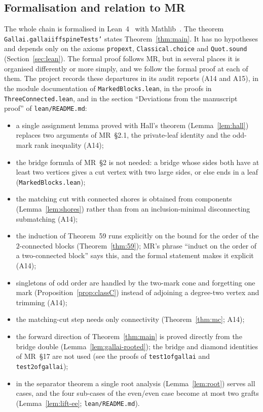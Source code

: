 \documentclass[11pt]{amsart}
\theoremstyle{definition}
\theoremstyle{remark}
\renewcommand{\_}{\oldunderscore\allowbreak}
\begin{document}
\subsection*{Formalisation and relation to MR}
The whole chain is formalised in Lean~4~\cite{Lean4} with Mathlib~\cite{Mathlib}. The theorem
\texttt{Gallai.gallai\_iff\_spineTests'} states Theorem~\ref{thm:main}. It has no hypotheses and
depends only on the axioms \texttt{propext}, \texttt{Classical.choice} and \texttt{Quot.sound}
(Section~\ref{sec:lean}). The formal proof follows MR, but in several places it is organised
differently or more simply, and we follow the formal proof at each of them. The project records
these departures in its audit reports (A14 and A15), in the module documentation of
\texttt{MarkedBlocks.lean}, in the proofs in \texttt{ThreeConnected.lean}, and in the section
``Deviations from the manuscript proof'' of \texttt{lean/README.md}:
\begin{itemize}
\item a single assignment lemma proved with Hall's theorem (Lemma~\ref{lem:hall}) replaces two
arguments of MR~\S2.1, the private-leaf identity and the odd-mark rank inequality (A14);
\item the bridge formula of MR~\S2 is not needed: a bridge whose sides both have at least two
vertices gives a cut vertex with two large sides, or else ends in a leaf (\texttt{MarkedBlocks.lean});
\item the matching cut with connected shores is obtained from components
(Lemma~\ref{lem:shores}) rather than from an inclusion-minimal disconnecting submatching (A14);
\item the induction of Theorem~59 runs explicitly on the bound for the order of the
$2$-connected blocks (Theorem~\ref{thm:59}); MR's phrase ``induct on the order of a two-connected
block'' says this, and the formal statement makes it explicit (A14);
\item singletons of odd order are handled by the two-mark cone and forgetting one mark
(Proposition~\ref{prop:classC}) instead of adjoining a degree-two vertex and trimming (A14);
\item the matching-cut step needs only connectivity (Theorem~\ref{thm:mc}; A14);
\item the forward direction of Theorem~\ref{thm:main} is proved directly from the bridge double
(Lemma~\ref{lem:gallai-rooted}); the bridge and diamond identities of MR~\S17 are not used
(see the proofs of \texttt{test1\_of\_gallai} and \texttt{test2\_of\_gallai});
\item in the separator theorem a single root analysis (Lemma~\ref{lem:root}) serves all cases, and
the four sub-cases of the even/even case become at most two grafts (Lemma~\ref{lem:lift-ee};
\texttt{lean/README.md}).
\end{itemize}
\end{document}
